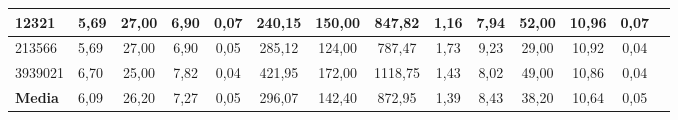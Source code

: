 \documentclass[12pt, spanish]{article}
\begin{document}
\begin{table}[H]
\begin{adjustwidth}{-1cm}{-1cm}
\begin{tabular}{|l|l|c|c|c|c|c|c|c|c|c|c|c|c|}
12321                                                   & 5,69                         & 27,00                          & 6,90                      & 0,07                   & 240,15                       & 150,00                         & 847,82                    & 1,16                   & 7,94                         & 52,00                          & 10,96                     & 0,07                   \\ \hline
213566                                                  & 5,69                         & 27,00                          & 6,90                      & 0,05                   & 285,12                       & 124,00                         & 787,47                    & 1,73                   & 9,23                         & 29,00                          & 10,92                     & 0,04                   \\ \hline
3939021                                                 & 6,70                         & 25,00                          & 7,82                      & 0,04                   & 421,95                       & 172,00                         & 1118,75                   & 1,43                   & 8,02                         & 49,00                          & 10,86                     & 0,04                   \\ \hline
\textbf{Media}                                          & 6,09                         & 26,20                          & 7,27                      & 0,05                   & 296,07                       & 142,40                         & 872,95                    & 1,39                   & 8,43                         & 38,20                          & 10,64                     & 0,05                   \\ \hline
\end{tabular}

\end{adjustwidth}

\end{table}	
\end{document}
